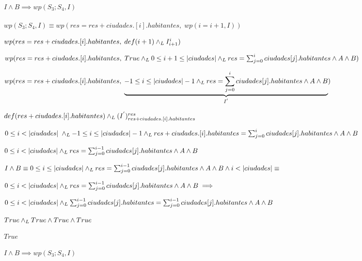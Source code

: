\documentclass[10pt,a4paper]{article}
\begin{document}
\paragraph{$I \wedge B \implies wp(S_{3};S_{4}, I)$}
$wp(S_{3};S_{4}, I) \equiv wp(res = res + ciudades.[i].habitantes, \; wp(i = i + 1, I))$ \equiv \par
\vspace{5px}
$wp(res = res + ciudades.[i].habitantes, \; def(i+1) \land _L I_{i+1}^{i})$ \equiv \par
\vspace{5px}
$wp(res = res + ciudades.[i].habitantes, \; True \land _L 0 \leq i + 1 \leq |ciudades| \land _L res = \sum_{j=0}^{i}{ciudades[j].habitantes} \wedge A \wedge B)$ \equiv \par
\vspace{5px}
$wp(res = res + ciudades.[i].habitantes, \; \underbrace{-1 \leq i \leq |ciudades| - 1 \land _L res = \sum_{j=0}^{i}{ciudades[j].habitantes} \wedge A \wedge B}_{I^{'}})$ \equiv \par
\vspace{5px}
$def(res + ciudades.[i].habitantes) \land _L (I^{'})_{res + ciudades.[i].habitantes}^{res}$ \equiv \par
\vspace{5px}
$0 \leq i < |ciudades| \; \land _L -1 \leq i \leq |ciudades| - 1 \land _L res + ciudades.[i].habitantes = \sum_{j=0}^{i}{ciudades[j].habitantes} \wedge A \wedge B$ \equiv \par
\vspace{5px}
$0 \leq i < |ciudades| \land _L res = \sum_{j=0}^{i-1}{ciudades[j].habitantes} \wedge A \wedge B$ \par
\vspace{20px}

$I \wedge B \equiv 0 \leq i \leq |ciudades| \land _L res = \sum_{j=0}^{i-1} ciudades[j].habitantes \wedge A \wedge B \wedge i < |ciudades| \equiv$\par

\begin{center}
$0 \leq i < |ciudades| \land _L res = \sum_{j=0}^{i-1} ciudades[j].habitantes \wedge A \wedge B \implies  $ \par
\vspace{5px}
$ 0 \leq i < |ciudades| \land _L \sum_{j=0}^{i-1} ciudades[j].habitantes = \sum_{j=0}^{i-1} ciudades[j].habitantes \wedge A \wedge B$  \equiv \par
\vspace{5px}
$True \land _L True \wedge True \wedge True$ \equiv \par
\vspace{5px}
$True$\par
\vspace{5px}
    $I \wedge B \implies wp(S_{3};S_{4}, I)$
\end{center}
\end{document}
